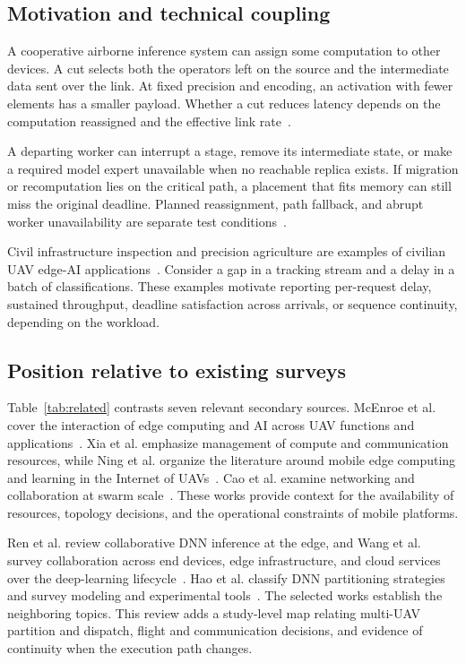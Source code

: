 \documentclass[pdflatex,sn-vancouver-num]{sn-jnl}
\begin{document}
\subsection{Motivation and technical coupling}
A cooperative airborne inference system can assign some computation to other devices. A cut selects both the operators left on the source and the intermediate data sent over the link. At fixed precision and encoding, an activation with fewer elements has a smaller payload. Whether a cut reduces latency depends on the computation reassigned and the effective link rate~\cite{R0001,R0010,R0092,R0121}.

A departing worker can interrupt a stage, remove its intermediate state, or make a required model expert unavailable when no reachable replica exists. If migration or recomputation lies on the critical path, a placement that fits memory can still miss the original deadline. Planned reassignment, path fallback, and abrupt worker unavailability are separate test conditions~\cite{R0002,R0038,R0062,R0110,R0118,R0292}.

Civil infrastructure inspection and precision agriculture are examples of civilian UAV edge-AI applications~\cite{survey_uav_edge_ai}. Consider a gap in a tracking stream and a delay in a batch of classifications. These examples motivate reporting per-request delay, sustained throughput, deadline satisfaction across arrivals, or sequence continuity, depending on the workload.

\subsection{Position relative to existing surveys}
Table~\ref{tab:related} contrasts seven relevant secondary sources. McEnroe et al. cover the interaction of edge computing and AI across UAV functions and applications~\cite{survey_uav_edge_ai}. Xia et al. emphasize management of compute and communication resources, while Ning et al. organize the literature around mobile edge computing and learning in the Internet of UAVs~\cite{survey_uav_resource,survey_iouav_mec_ml}. Cao et al. examine networking and collaboration at swarm scale~\cite{survey_uav_swarm_ci}. These works provide context for the availability of resources, topology decisions, and the operational constraints of mobile platforms.

Ren et al. review collaborative DNN inference at the edge, and Wang et al. survey collaboration across end devices, edge infrastructure, and cloud services over the deep-learning lifecycle~\cite{survey_collab_dnn,survey_end_edge_cloud}. Hao et al. classify DNN partitioning strategies and survey modeling and experimental tools~\cite{survey_hao2026}. The selected works establish the neighboring topics. This review adds a study-level map relating multi-UAV partition and dispatch, flight and communication decisions, and evidence of continuity when the execution path changes.
\end{document}
